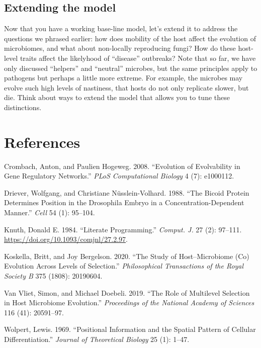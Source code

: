 \documentclass[
  letterpaper,
  DIV=11,
  numbers=noendperiod]{scrreprt}
\newlength{\cslhangindent}
\newenvironment{CSLReferences}[2] %
 {\begin{list}{}{%
  \setlength{\itemindent}{0pt}
  \setlength{\leftmargin}{0pt}
  \setlength{\parsep}{0pt}
  \ifodd #1
   \setlength{\leftmargin}{\cslhangindent}
   \setlength{\itemindent}{-1\cslhangindent}
  \fi
  \setlength{\itemsep}{#2\baselineskip}}}
 {\end{list}}
\theoremstyle{definition}
\theoremstyle{remark}
\begin{document}
\section{Extending the model}\label{extending-the-model}

Now that you have a working base-line model, let's extend it to address
the questions we phrased earlier: how does mobility of the host affect
the evolution of microbiomes, and what about non-locally reproducing
fungi? How do these host-level traits affect the likelyhood of
``disease'' outbreaks? Note that so far, we have only discussed
``helpers'' and ``neutral'' microbes, but the same principles apply to
pathogens but perhaps a little more extreme. For example, the microbes
may evolve such high levels of nastiness, that hosts do not only
replicate slower, but die. Think about ways to extend the model that
allows you to tune these distinctions.


\chapter*{References}\label{references-1}


\label{refs}
\begin{CSLReferences}{1}{0}
Crombach, Anton, and Paulien Hogeweg. 2008. {``Evolution of Evolvability
in Gene Regulatory Networks.''} \emph{PLoS Computational Biology} 4 (7):
e1000112.

Driever, Wolfgang, and Christiane Nüsslein-Volhard. 1988. {``The Bicoid
Protein Determines Position in the Drosophila Embryo in a
Concentration-Dependent Manner.''} \emph{Cell} 54 (1): 95--104.

Knuth, Donald E. 1984. {``Literate Programming.''} \emph{Comput. J.} 27
(2): 97--111. \url{https://doi.org/10.1093/comjnl/27.2.97}.

Koskella, Britt, and Joy Bergelson. 2020. {``The Study of
Host--Microbiome (Co) Evolution Across Levels of Selection.''}
\emph{Philosophical Transactions of the Royal Society B} 375 (1808):
20190604.

Van Vliet, Simon, and Michael Doebeli. 2019. {``The Role of Multilevel
Selection in Host Microbiome Evolution.''} \emph{Proceedings of the
National Academy of Sciences} 116 (41): 20591--97.

Wolpert, Lewis. 1969. {``Positional Information and the Spatial Pattern
of Cellular Differentiation.''} \emph{Journal of Theoretical Biology} 25
(1): 1--47.

\end{CSLReferences}
\end{document}
